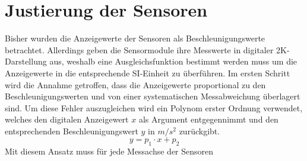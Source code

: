 \section{Justierung der Sensoren}
Bisher wurden die Anzeigewerte der Sensoren als Beschleunigungswerte betrachtet. Allerdings geben die Sensormodule ihre Messwerte in digitaler 2K-Darstellung aus, weshalb eine Ausgleichsfunktion bestimmt werden muss um die Anzeigewerte in die entsprechende SI-Einheit zu überführen. Im ersten Schritt wird die Annahme getroffen, dass die Anzeigewerte proportional zu den Beschleunigungswerten und von einer systematischen Messabweichung überlagert sind. Um diese Fehler auszugleichen wird ein Polynom erster Ordnung verwendet, welches den digitalen Anzeigewert $x$ als Argument entgegennimmt und den entsprechenden Beschleunigungswert $y$ in $m/s^2$ zurückgibt.
\begin{equation}
y = p_1\cdot x + p_2
\end{equation}
Mit diesem Ansatz muss für jede Messachse der Sensoren 